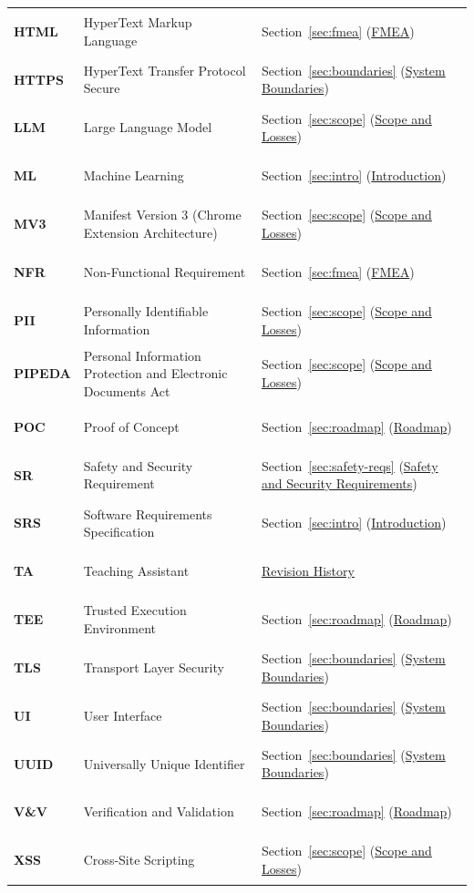 \documentclass[11pt]{article}
\begin{document}
{\begin{tabularx}{\textwidth}{l P{6.4cm} Y}
\hypertarget{ha-acr-html}{\textbf{HTML}} & HyperText Markup Language & Section~\ref{sec:fmea} (\hyperref[sec:fmea]{FMEA})\\
\hypertarget{ha-acr-https}{\textbf{HTTPS}} & HyperText Transfer Protocol Secure & Section~\ref{sec:boundaries} (\hyperref[sec:boundaries]{System Boundaries})\\
\hypertarget{ha-acr-llm}{\textbf{LLM}} & Large Language Model & Section~\ref{sec:scope} (\hyperref[sec:scope]{Scope and Losses})\\
\hypertarget{ha-acr-ml}{\textbf{ML}} & Machine Learning & Section~\ref{sec:intro} (\hyperref[sec:intro]{Introduction})\\
\hypertarget{ha-acr-mv3}{\textbf{MV3}} & Manifest Version 3 (Chrome Extension Architecture) & Section~\ref{sec:scope} (\hyperref[sec:scope]{Scope and Losses})\\
\hypertarget{ha-acr-nfr}{\textbf{NFR}} & Non-Functional Requirement & Section~\ref{sec:fmea} (\hyperref[sec:fmea]{FMEA})\\
\hypertarget{ha-acr-pii}{\textbf{PII}} & Personally Identifiable Information & Section~\ref{sec:scope} (\hyperref[sec:scope]{Scope and Losses})\\
\hypertarget{ha-acr-pipeda}{\textbf{PIPEDA}} & Personal Information Protection and Electronic Documents Act & Section~\ref{sec:scope} (\hyperref[sec:scope]{Scope and Losses})\\
\hypertarget{ha-acr-poc}{\textbf{POC}} & Proof of Concept & Section~\ref{sec:roadmap} (\hyperref[sec:roadmap]{Roadmap})\\
\hypertarget{ha-acr-sr}{\textbf{SR}} & Safety and Security Requirement & Section~\ref{sec:safety-reqs} (\hyperref[sec:safety-reqs]{Safety and Security Requirements})\\
\hypertarget{ha-acr-srs}{\textbf{SRS}} & Software Requirements Specification & Section~\ref{sec:intro} (\hyperref[sec:intro]{Introduction})\\
\hypertarget{ha-acr-ta}{\textbf{TA}} & Teaching Assistant & \hyperref[TblRevisionHistory]{Revision History}\\
\hypertarget{ha-acr-tee}{\textbf{TEE}} & Trusted Execution Environment & Section~\ref{sec:roadmap} (\hyperref[sec:roadmap]{Roadmap})\\
\hypertarget{ha-acr-tls}{\textbf{TLS}} & Transport Layer Security & Section~\ref{sec:boundaries} (\hyperref[sec:boundaries]{System Boundaries})\\
\hypertarget{ha-acr-ui}{\textbf{UI}} & User Interface & Section~\ref{sec:boundaries} (\hyperref[sec:boundaries]{System Boundaries})\\
\hypertarget{ha-acr-uuid}{\textbf{UUID}} & Universally Unique Identifier & Section~\ref{sec:boundaries} (\hyperref[sec:boundaries]{System Boundaries})\\
\hypertarget{ha-acr-vnv}{\textbf{V\&V}} & Verification and Validation & Section~\ref{sec:roadmap} (\hyperref[sec:roadmap]{Roadmap})\\
\hypertarget{ha-acr-xss}{\textbf{XSS}} & Cross-Site Scripting & Section~\ref{sec:scope} (\hyperref[sec:scope]{Scope and Losses})\\
\end{tabularx}
}
\end{document}

